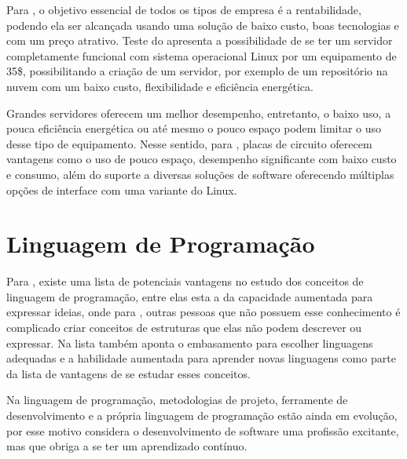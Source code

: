 Para \cite{aristotelous2016}, o objetivo essencial de todos os tipos de empresa é a rentabilidade, podendo ela ser alcançada usando uma solução de baixo custo, boas tecnologias e com um preço atrativo. Teste do \cite{aristotelous2016} apresenta a possibilidade de se ter um servidor completamente funcional com sistema operacional Linux por um equipamento de 35\$, possibilitando a criação de um servidor, por exemplo de um repositório na nuvem com um baixo custo, flexibilidade e eficiência energética. 

Grandes servidores oferecem um melhor desempenho, entretanto, o baixo uso, a pouca eficiência energética ou até mesmo o pouco espaço podem limitar o uso desse tipo de equipamento. Nesse sentido, para \cite{Cusick}, placas de circuito oferecem vantagens como o uso de pouco espaço, desempenho significante com baixo custo e consumo, além do suporte a diversas soluções de software oferecendo múltiplas opções de interface com uma variante do Linux. 

\section{Linguagem de Programação}
Para \cite{sebesta2011}, existe uma lista de potenciais vantagens no estudo dos conceitos de linguagem de programação, entre elas esta a da capacidade aumentada para expressar ideias, onde para \cite{sebesta2011}, outras pessoas que não possuem esse conhecimento é complicado criar conceitos de estruturas que elas não podem descrever ou expressar. Na lista também aponta o embasamento para escolher linguagens adequadas e a habilidade aumentada para aprender novas linguagens como parte da lista de vantagens de se estudar esses conceitos.

Na linguagem de programação, metodologias de projeto, ferramente de desenvolvimento e a própria linguagem de programação estão ainda em evolução, por esse motivo \cite{sebesta2011} considera o desenvolvimento de software uma profissão excitante, mas que obriga a se ter um aprendizado contínuo.

%


%
